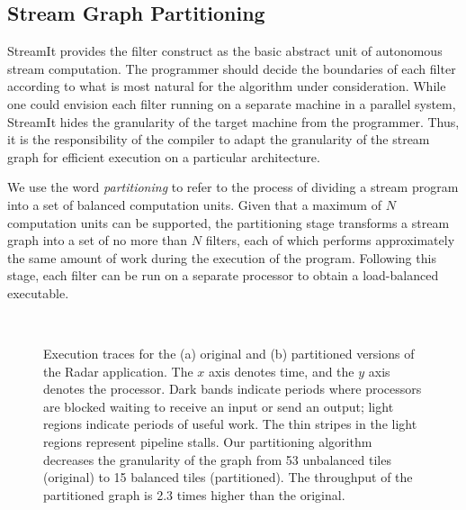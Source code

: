 \newcommand{\mt}[1]{\mbox{\it #1}}

\subsection{Stream Graph Partitioning}
\label{sec:partition}

StreamIt provides the filter construct as the basic abstract unit of
autonomous stream computation.  The programmer should decide the
boundaries of each filter according to what is most natural for the
algorithm under consideration.  While one could envision each filter
running on a separate machine in a parallel system, StreamIt hides the
granularity of the target machine from the programmer.  Thus, it is
the responsibility of the compiler to adapt the granularity of the
stream graph for efficient execution on a particular architecture.

We use the word {\it partitioning} to refer to the process of dividing
a stream program into a set of balanced computation units.  Given that
a maximum of $N$ computation units can be supported, the partitioning
stage transforms a stream graph into a set of no more than $N$
filters, each of which performs approximately the same amount of work
during the execution of the program.  Following this stage, each
filter can be run on a separate processor to obtain a load-balanced
executable.


\begin{figure}[!h]
   \\
  \hspace{0.3in}  \caption{\protect\small Execution
    traces for the (a) original and (b) partitioned versions of the
    Radar application.  The $x$ axis denotes time, and the $y$ axis
    denotes the processor.  Dark bands indicate periods where
    processors are blocked waiting to receive an input or send an
    output; light regions indicate periods of useful work.  The thin
    stripes in the light regions represent pipeline stalls.  Our
    partitioning algorithm decreases the granularity of the graph from
    53 unbalanced tiles (original) to 15 balanced tiles (partitioned).
    The throughput of the partitioned graph is 2.3 times higher than
    the original. \protect\label{fig:beam-blood}}
\end{figure}

